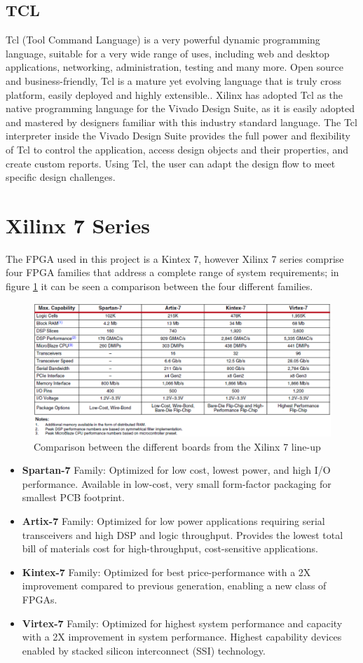 \subsection{TCL}
Tcl (Tool Command Language) is a very powerful dynamic programming language, suitable for a very wide range of uses, including web and desktop applications, networking, administration, testing and many more. Open source and business-friendly, Tcl is a mature yet evolving language that is truly cross platform, easily deployed and highly extensible.\cite{tcl}.
Xilinx has adopted Tcl as the native programming language for the Vivado Design Suite,
as it is easily adopted and mastered by designers familiar with this industry standard
language. The Tcl interpreter inside the Vivado Design Suite provides the full power and
flexibility of Tcl to control the application, access design objects and their properties, and
create custom reports. Using Tcl, the user can adapt the design flow to meet specific design
challenges.


\section{Xilinx 7 Series}
\noindent The FPGA used in this project is a Kintex 7, however Xilinx 7 series comprise four FPGA families that address a complete range of system requirements; in figure \ref{fig:kintex72} it can be seen a comparison between the four different families.
\begin{figure}[H]
	\centering
	\includegraphics[width=0.9\linewidth]{IMG/ch3/KINTEX72}
	\caption{Comparison between the different boards from the Xilinx 7 line-up}
	\label{fig:kintex72}
\end{figure}
\begin{itemize}
	\item  \textbf{Spartan-7} Family: Optimized for low cost, lowest power, and high
	I/O performance. Available in low-cost, very small form-factor
	packaging for smallest PCB footprint.
	\item \textbf{Artix-7} Family: Optimized for low power applications requiring serial
	transceivers and high DSP and logic throughput. Provides the lowest
	total bill of materials cost for high-throughput, cost-sensitive
	applications.
	\item \textbf{Kintex-7} Family: Optimized for best price-performance with a 2X
	improvement compared to previous generation, enabling a new class
	of FPGAs.
	\item \textbf{Virtex-7} Family: Optimized for highest system performance and
	capacity with a 2X improvement in system performance. Highest
	capability devices enabled by stacked silicon interconnect (SSI)
	technology.
\end{itemize}
